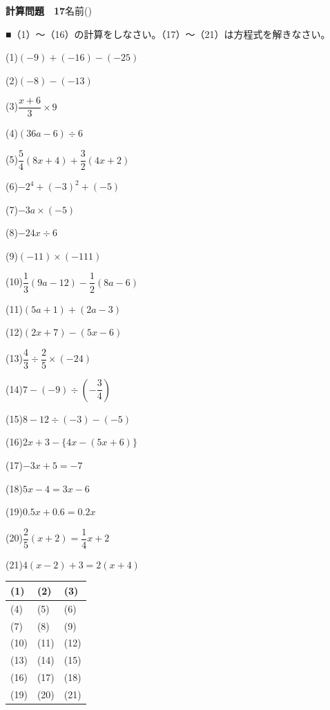 \documentclass[a4paper,11pt]{ltjsarticle}
\newlength{\qcol}\setlength{\qcol}{0.47\textwidth}
\newlength{\qgap}
\newlength{\anscolw}\setlength{\anscolw}{0.30\textwidth}
\newlength{\ansh}
\newcommand{\Q}[2]{\parbox[t]{\qcol}{\raggedright (#1)\hspace{0.6em}$\displaystyle #2$}}
\newcommand{\QR}[4]{\Q{#1}{#2}\hfill\Q{#3}{#4}\par\vspace{\qgap}}
\newcommand{\anscell}[1]{\rule[-\ansdrop]{0pt}{\ansh}(#1)}
\newlength{\ansdrop}
\begin{document}
{\large\bfseries 計算問題　17}\hfill 名前(\underline{\hspace{32mm}})\par\vspace{3mm}
■（1）〜（16）の計算をしなさい。（17）〜（21）は方程式を解きなさい。\par\vspace{3mm}
\setlength{\qgap}{5.4mm}
\QR{1}{(-9)+(-16)-(-25)}{2}{(-8)-(-13)}
\QR{3}{\dfrac{x+6}{3}\times9}{4}{(36a-6)\div6}
\QR{5}{\dfrac{5}{4}(8x+4)+\dfrac{3}{2}(4x+2)}{6}{-2^4+(-3)^2+(-5)}
\QR{7}{-3a\times(-5)}{8}{-24x\div6}
\QR{9}{(-11)\times(-111)}{10}{\dfrac{1}{3}(9a-12)-\dfrac{1}{2}(8a-6)}
\QR{11}{(5a+1)+(2a-3)}{12}{(2x+7)-(5x-6)}
\QR{13}{\dfrac{4}{3}\div\dfrac{2}{5}\times(-24)}{14}{7-(-9)\div\left(-\dfrac{3}{4}\right)}
\QR{15}{8-12\div(-3)-(-5)}{16}{2x+3-\{4x-(5x+6)\}}
\QR{17}{-3x+5=-7}{18}{5x-4=3x-6}
\QR{19}{0.5x+0.6=0.2x}{20}{\dfrac{2}{5}(x+2)=\dfrac{1}{4}x+2}
\vspace{1mm}
\Q{21}{4(x-2)+3=2(x+4)}\par\vspace{3mm}
\setlength{\ansh}{9.5mm}\setlength{\ansdrop}{6mm}%
\begin{center}\begin{tabular}{|p{\anscolw}|p{\anscolw}|p{\anscolw}|}\hline
\anscell{1} & \anscell{2} & \anscell{3} \\\hline
\anscell{4} & \anscell{5} & \anscell{6} \\\hline
\anscell{7} & \anscell{8} & \anscell{9} \\\hline
\anscell{10} & \anscell{11} & \anscell{12} \\\hline
\anscell{13} & \anscell{14} & \anscell{15} \\\hline
\anscell{16} & \anscell{17} & \anscell{18} \\\hline
\anscell{19} & \anscell{20} & \anscell{21} \\\hline
\end{tabular}\end{center}
\end{document}
